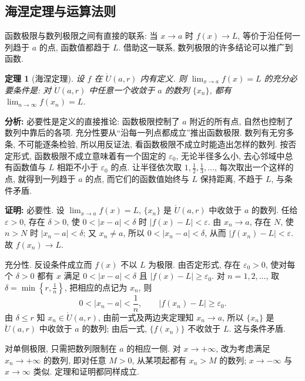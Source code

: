 \documentclass[UTF8,openany]{ctexbook}
\theoremstyle{chinesetextbook}
\newtheorem{theorem}{定理}[section]
\newenvironment{cnproof}{\par\indent\textbf{证明:} \ignorespaces}{\par}
\begin{document}
\subsection{海涅定理与运算法则}
函数极限与数列极限之间有直接的联系: 当 $x\to a$ 时 $f(x)\to L$, 等价于沿任何一列趋于 $a$ 的点, 函数值都趋于 $L$. 借助这一联系, 数列极限的许多结论可以推广到函数.
\begin{theorem}[海涅定理]
设 $f$ 在 $\mathring U(a,r)$ 内有定义. 则 $\displaystyle\lim_{x\to a}f(x)=L$ 的充分必要条件是: 对 $\mathring U(a,r)$ 中任意一个收敛于 $a$ 的数列 $\{x_n\}$, 都有 $\displaystyle\lim_{n\to\infty}f(x_n)=L$.
\end{theorem}
\par\indent\textbf{分析:} 必要性是定义的直接推论: 函数极限控制了 $a$ 附近的所有点, 自然也控制了数列中靠后的各项. 充分性要从“沿每一列点都成立”推出函数极限. 数列有无穷多条, 不可能逐条检验, 所以用反证法, 看函数极限不成立时能造出怎样的数列. 按否定形式, 函数极限不成立意味着有一个固定的 $\varepsilon_0$, 无论半径多么小, 去心邻域中总有函数值与 $L$ 相距不小于 $\varepsilon_0$ 的点. 让半径依次取 $\displaystyle1,\frac12,\frac13,\ldots$, 每次取出一个这样的点, 就得到一列趋于 $a$ 的点, 而它们的函数值始终与 $L$ 保持距离, 不趋于 $L$, 与条件矛盾.
\begin{cnproof}
必要性. 设 $\displaystyle\lim_{x\to a}f(x)=L$, $\{x_n\}$ 是 $\mathring U(a,r)$ 中收敛于 $a$ 的数列. 任给 $\varepsilon>0$, 存在 $\delta>0$, 使 $0<|x-a|<\delta$ 时 $|f(x)-L|<\varepsilon$. 由 $x_n\to a$, 存在 $N$, 使 $n>N$ 时 $|x_n-a|<\delta$; 又 $x_n\ne a$, 所以 $0<|x_n-a|<\delta$, 从而 $|f(x_n)-L|<\varepsilon$. 故 $f(x_n)\to L$.

充分性. 反设条件成立而 $f(x)$ 不以 $L$ 为极限. 由否定形式, 存在 $\varepsilon_0>0$, 使对每个 $\delta>0$ 都有 $x$ 满足 $0<|x-a|<\delta$ 且 $|f(x)-L|\ge\varepsilon_0$. 对 $n=1,2,\ldots$, 取 $\displaystyle\delta=\min\left\{r,\frac1n\right\}$, 把相应的点记为 $x_n$, 则
\[
0<|x_n-a|<\frac1n,\qquad|f(x_n)-L|\ge\varepsilon_0.
\]
由 $\delta\le r$ 知 $x_n\in\mathring U(a,r)$, 由前一式及两边夹定理知 $x_n\to a$, 所以 $\{x_n\}$ 是 $\mathring U(a,r)$ 中收敛于 $a$ 的数列; 由后一式, $\{f(x_n)\}$ 不收敛于 $L$. 这与条件矛盾.
\end{cnproof}
对单侧极限, 只需把数列限制在 $a$ 的相应一侧. 对 $x\to+\infty$, 改为考虑满足 $x_n\to+\infty$ 的数列, 即对任意 $M>0$, 从某项起都有 $x_n>M$ 的数列; $x\to-\infty$ 与 $x\to\infty$ 类似. 定理和证明都同样成立.
\end{document}

